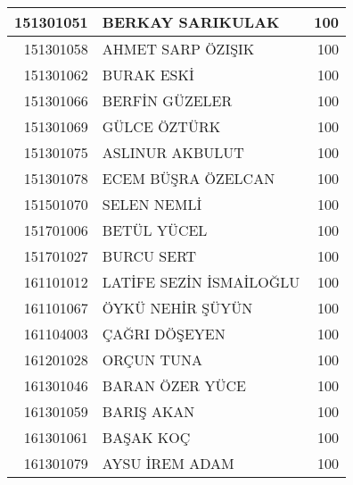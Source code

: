 \documentclass[12pt]{article}
\begin{document}
\begin{longtable}{||r||l||r||}
    \midrule
    151301051 & BERKAY SARIKULAK & 100 \\
    \midrule
    151301058 & AHMET SARP ÖZIŞIK & 100 \\
    \midrule
    151301062 & BURAK ESKİ & 100 \\
    \midrule
    151301066 & BERFİN GÜZELER & 100 \\
    \midrule
    151301069 & GÜLCE ÖZTÜRK & 100 \\
    \midrule
    151301075 & ASLINUR AKBULUT & 100 \\
    \midrule
    151301078 & ECEM BÜŞRA ÖZELCAN & 100 \\
    \midrule
    151501070 & SELEN NEMLİ & 100 \\
    \midrule
    151701006 & BETÜL YÜCEL & 100 \\
    \midrule
    151701027 & BURCU SERT & 100 \\
    \midrule
    161101012 & LATİFE SEZİN İSMAİLOĞLU & 100 \\
    \midrule
    161101067 & ÖYKÜ NEHİR ŞÜYÜN & 100 \\
    \midrule
    161104003 & ÇAĞRI DÖŞEYEN & 100 \\
    \midrule
    161201028 & ORÇUN TUNA & 100 \\
    \midrule
    161301046 & BARAN ÖZER YÜCE & 100 \\
    \midrule
    161301059 & BARIŞ AKAN & 100 \\
    \midrule
    161301061 & BAŞAK KOÇ & 100 \\
    \midrule
    161301079 & AYSU İREM ADAM & 100 
  \label{tab:addlabel} \\\hline
\end{longtable}%
\end{document}
